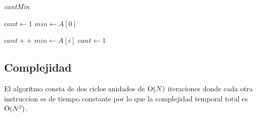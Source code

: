 \bigskip

\begin{algorithm}[H]
	\caption{\textit{cantMin}}

	$cant \gets 1$ \;
	$min \gets A[0]$ \;

     {
    	 {
    		$cant++$ \;
    	}
    	 {
			$min \gets A[i]$ \;
    		$cant \gets 1$ \;
    	}
	}

\end{algorithm}

\bigskip

\subsection{Complejidad}

El algoritmo consta de dos ciclos anidados de $\operatorname{O}(N)$ iteraciones donde cada
otra instruccíon es de tiempo constante por lo que la complejidad temporal
total es $\operatorname{O}(N^2)$.
